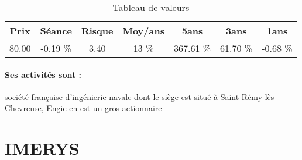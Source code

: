 \documentclass[11pt,a4paper]{report}%
\begin{document}
\begin{table}[H]
  \centering
    \begin{tabular}{|c|c|c|c|c|c|c|}
    \hline
    Prix & Séance & Risque  & Moy/ans & 5ans & 3ans & 1ans \\
    \hline
    80.00 &    -0.19 \%    & 3.40 & 13 \% & 367.61 \% & 61.70 \% & -0.68 \% \\
    \hline
    \end{tabular}%
        \label{tab:table_GAZTRANSPORT TECHN}%
      \caption{Tableau de valeurs}
\end{table}%

\paragraph{Ses activités sont : } société française d'ingénierie navale dont le siège est situé à Saint-Rémy-lès-Chevreuse, Engie en est un gros actionnaire 
    
    \newpage

\section{IMERYS}
\end{document}
